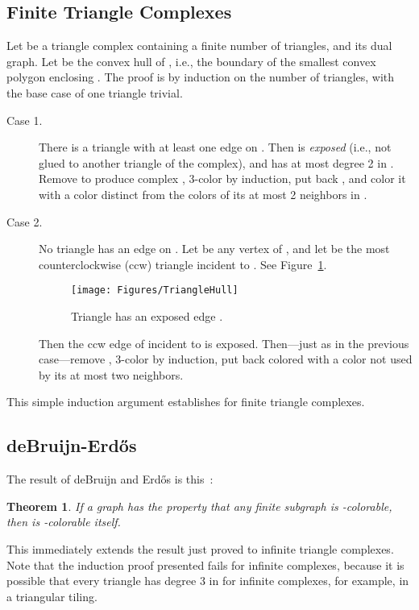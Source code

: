 \pdfoutput=1  \documentclass[]{article}
\newtheorem{theorem}{{\bf Theorem}}
\newcommand{\thmlab}[1]{\label{thm:#1}}
\newcommand{\figlab}[1]{\label{fig:#1}}
\newcommand{\figref}[1]{\ref{fig:#1}}
\begin{document}
\subsection{Finite Triangle Complexes}
Let  be a triangle complex containing a finite number of triangles,
and  its dual graph.
Let  be the convex hull of , i.e., the boundary of the
smallest
convex polygon enclosing .
The proof is by induction on the number of triangles, with
the base case of one triangle trivial.
\begin{description}
\item[Case 1.] There is a triangle  with at least one edge  on
  .
Then  is \emph{exposed}
(i.e., not glued to another
triangle of the complex),
and  has at most degree 2 in .
Remove  to produce complex , 3-color  by induction,
put back , and color it with a color distinct from the colors of
its
at most 2 neighbors in .
\item[Case 2.] No triangle has an edge on .  Let  be any vertex
  of , and let  be the most counterclockwise (ccw) triangle incident
  to .
See Figure~\figref{TriangleHull}.
\begin{figure}[htbp]
\centering
\texttt{[image: Figures/TriangleHull]}
\caption{Triangle  has an exposed edge .}
\figlab{TriangleHull}
\end{figure}
Then the ccw edge  of  incident to  is exposed.
Then---just as in the previous case---remove
,
3-color by induction, put  back colored with a color not used by
its
at most two neighbors.
\end{description}
This simple induction argument establishes  for finite triangle complexes.

\subsection{deBruijn-Erd\H{o}s}

The result of deBruijn and  Erd\H{o}s is this~\cite{ed-cpigp-51}:
\begin{theorem}
If a graph  has the property that any finite subgraph is
-colorable,
then  is -colorable itself.
\thmlab{deB-E}
\end{theorem}


This immediately extends the result just proved to infinite triangle
complexes.
Note that the induction proof presented fails for infinite complexes, 
because it is possible that every
triangle
has degree 3 in  for infinite complexes,
for example, in a triangular tiling.
\end{document}
